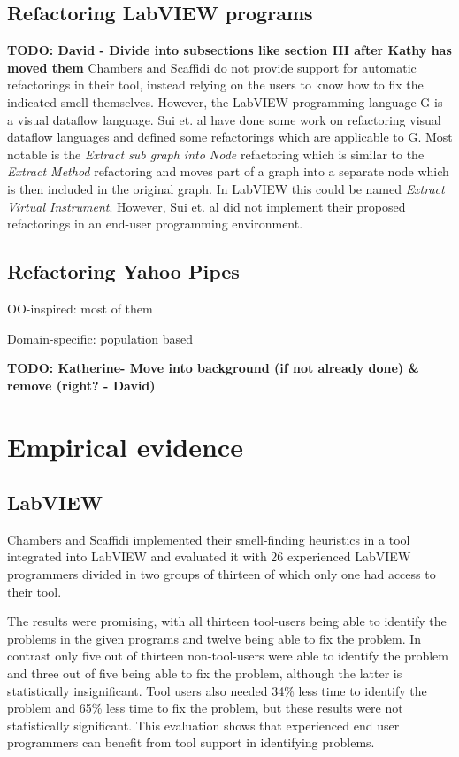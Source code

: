 \documentclass[10pt,conference,compsocconf]{IEEEtran}
\newcommand{\todo}[1]{\textbf{TODO: #1}}
\begin{document}
\subsection{Refactoring LabVIEW programs}
\todo{David - Divide into subsections like section III after Kathy has moved them}
Chambers and Scaffidi \cite{chambers2013smell} do not provide support for automatic refactorings in their tool, instead relying on the users to know how to fix the indicated smell themselves.
However, the LabVIEW programming language G is a visual dataflow language.
Sui et. al \cite{sui2008automated} have done some work on refactoring visual dataflow languages and defined some refactorings which are applicable to G.
Most notable is the \textit{Extract sub graph into Node} refactoring which is similar to the \textit{Extract Method} refactoring and moves part of a graph into a separate node which is then included in the original graph.
In LabVIEW this could be named \textit{Extract Virtual Instrument}.
However, Sui et. al did not implement their proposed refactorings in an end-user programming environment.

\subsection{Refactoring Yahoo Pipes}

OO-inspired: most of them

Domain-specific: population based


\todo{Katherine- Move into background (if not already done) \& remove (right? - David)}
\section{Empirical evidence}
\label{sec:empirical}

\subsection{LabVIEW}

Chambers and Scaffidi implemented their smell-finding heuristics in a tool integrated into LabVIEW and evaluated it with 26 experienced LabVIEW programmers divided in two groups of thirteen of which only one had access to their tool.

The results were promising, with all thirteen tool-users being able to identify the problems in the given programs and twelve being able to fix the problem.
In contrast only five out of thirteen non-tool-users were able to identify the problem and three out of five being able to fix the problem, although the latter is statistically insignificant.
Tool users also needed 34\% less time to identify the problem and 65\% less time to fix the problem, but these results were not statistically significant.
This evaluation shows that experienced end user programmers can benefit from tool support in identifying problems.
\end{document}
